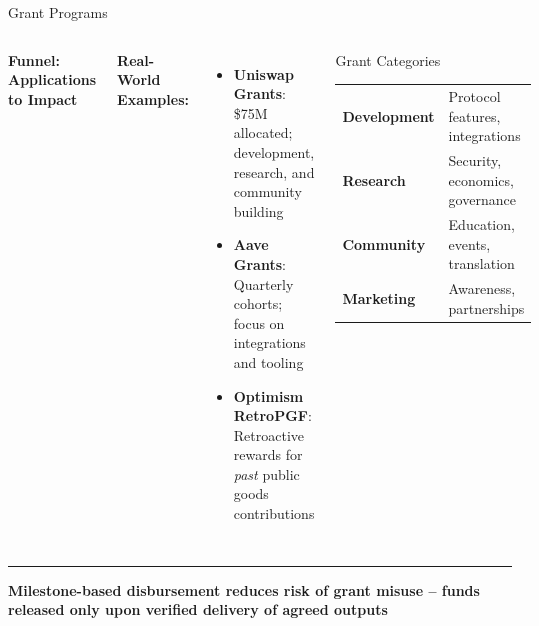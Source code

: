 \documentclass[8pt,aspectratio=169]{beamer}
\newcommand{\bottomnote}[1]{\vfill\vspace{-2mm}\textcolor{mllavender2}{\rule{\textwidth}{0.4pt}}\vspace{1mm}\footnotesize\textbf{#1}}
\begin{document}
\begin{frame}{Grant Programs}
\begin{columns}[T]
\vspace{2mm}
\textbf{\textcolor{mlpurple}{Funnel: Applications to Impact}}\\[4pt]

\vspace{2mm}
\textbf{\textcolor{mlpurple}{Real-World Examples:}}\\[4pt]
\begin{itemize}\setlength\itemsep{4pt}
  \item \textbf{Uniswap Grants}: \$75M allocated; development, research, and community building
  \item \textbf{Aave Grants}: Quarterly cohorts; focus on integrations and tooling
  \item \textbf{Optimism RetroPGF}: Retroactive rewards for \emph{past} public goods contributions
\end{itemize}
\vspace{4pt}
\begin{block}{Grant Categories}
\begin{tabular}{ll}
  \textbf{Development} & Protocol features, integrations\\
  \textbf{Research}    & Security, economics, governance\\
  \textbf{Community}   & Education, events, translation\\
  \textbf{Marketing}   & Awareness, partnerships\\
\end{tabular}
\end{block}
\end{columns}
\bottomnote{Milestone-based disbursement reduces risk of grant misuse -- funds released only upon verified delivery of agreed outputs}
\end{frame}
\end{document}
